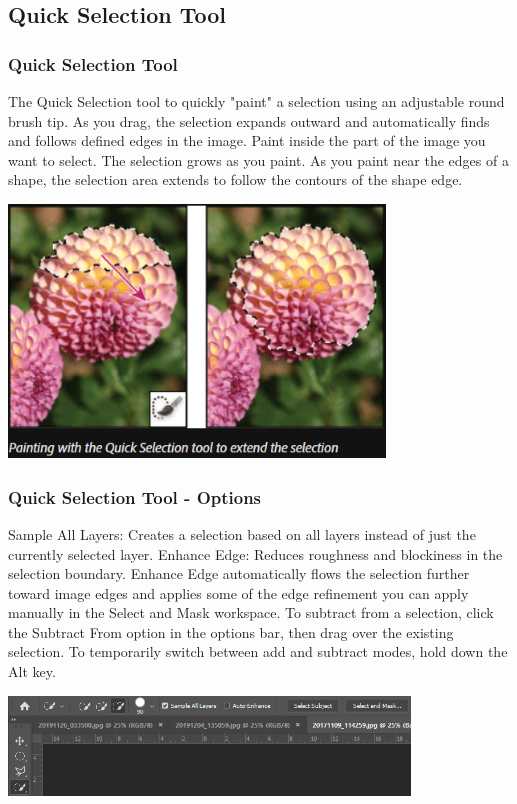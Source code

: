 \documentclass{beamer}
\begin{document}
\subsection{Quick Selection Tool}
\begin{frame}
	\frametitle{Quick Selection Tool}
	\begin{outline}
		\1 The Quick Selection tool  to quickly "paint" a selection using an adjustable round brush tip. 
		\1 As you drag, the selection expands outward and automatically finds and follows defined edges in the image.
		\1 Paint inside the part of the image you want to select. The selection grows as you paint. 
		\2 As you paint near the edges of a shape, the selection area extends to follow the contours of the shape edge.
	\end{outline}
	\begin{center}
		\includegraphics[width = 0.75\textwidth]{images/quick select.png}
	\end{center}
\end{frame}

\begin{frame}
	\frametitle{Quick Selection Tool - Options}
	\begin{outline}
		\1 Sample All Layers: 
		\2 Creates a selection based on all layers instead of just the currently selected layer.
		\1 Enhance Edge: 
		\2 Reduces roughness and blockiness in the selection boundary. Enhance Edge automatically flows the selection further toward image edges and applies some of the edge refinement you can apply manually in the Select and Mask workspace.
		\1 To subtract from a selection, click the Subtract From option in the options bar, then drag over the existing selection.
		\2 To temporarily switch between add and subtract modes, hold down the Alt key.
	\end{outline}
	\begin{center}
		\includegraphics[width = 0.8\textwidth]{images/quick select options.png}
	\end{center}
\end{frame}
\end{document}
